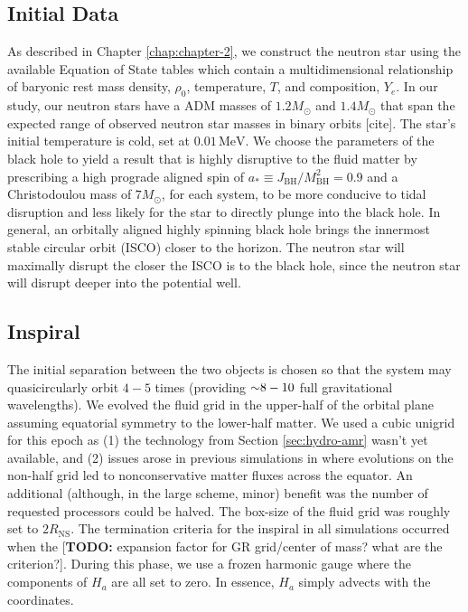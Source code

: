 \subsection{Initial Data} As described in Chapter \ref{chap:chapter-2}, we construct the neutron star using the available Equation of State tables which contain a multidimensional relationship of baryonic rest mass density, $\rho_0$, temperature, $T$, and composition, $Y_e$.  In our study, our neutron stars have a ADM masses of $1.2 M_\odot$ and $1.4 M_\odot$ that span the expected range of observed neutron star masses in binary orbits [cite].  The star's initial temperature is cold, set at $0.01\,\textrm{MeV}$.  We choose the parameters of the black hole to yield a result that is highly disruptive to the fluid matter by prescribing a high prograde aligned spin of $a_* \equiv J_\textrm{BH}/M_\textrm{BH}^2 = 0.9$ and a Christodoulou mass of $7 M_\odot$, for each system, to be more conducive to tidal disruption and less likely for the star to directly plunge into the black hole.
In general, an orbitally aligned highly spinning black hole brings the innermost stable circular orbit (ISCO) closer to the horizon.
The neutron star will maximally disrupt the closer the ISCO is to the black hole, since the  neutron star will disrupt deeper into the potential well.

\subsection{Inspiral} The initial separation between the two objects is chosen so that the system may quasicircularly orbit $4-5$ times (providing $\mathord{\sim} 8-10$ full gravitational wavelengths).  
We evolved the fluid grid in the upper-half of the orbital plane assuming equatorial symmetry to the lower-half matter.  We used a cubic unigrid for this epoch as (1) the technology from Section \ref{sec:hydro-amr} wasn't yet available, and (2) issues arose in previous simulations in \SpEC where evolutions on the non-half grid led to nonconservative matter fluxes across the equator.  
An additional (although, in the large scheme, minor) benefit was the number of requested processors could be halved.  
The box-size of the fluid grid was roughly set to $2 R_\textrm{NS}$.  
The termination criteria for the inspiral in all simulations occurred when the [\textbf{TODO:} expansion factor for GR grid/center of mass?  what are the criterion?].  
During this phase, we use a frozen harmonic gauge where the components of $H_a$ are all set to zero.  
In essence, $H_a$ simply advects with the coordinates.
	
